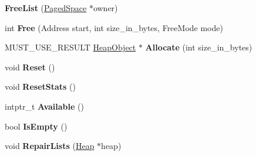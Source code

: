 \begin{DoxyCompactItemize}
\item 
{\bfseries Free\+List} (\hyperlink{classv8_1_1internal_1_1_paged_space}{Paged\+Space} $\ast$owner)\hypertarget{classv8_1_1internal_1_1_free_list_a60ffede5ec2f86afe99b4b10ee04dc2f}{}\label{classv8_1_1internal_1_1_free_list_a60ffede5ec2f86afe99b4b10ee04dc2f}

\item 
int {\bfseries Free} (Address start, int size\+\_\+in\+\_\+bytes, Free\+Mode mode)\hypertarget{classv8_1_1internal_1_1_free_list_a73700f8a2f6a9e94da40fa5bc18ea7dd}{}\label{classv8_1_1internal_1_1_free_list_a73700f8a2f6a9e94da40fa5bc18ea7dd}

\item 
M\+U\+S\+T\+\_\+\+U\+S\+E\+\_\+\+R\+E\+S\+U\+LT \hyperlink{classv8_1_1internal_1_1_heap_object}{Heap\+Object} $\ast$ {\bfseries Allocate} (int size\+\_\+in\+\_\+bytes)\hypertarget{classv8_1_1internal_1_1_free_list_a505524588fa29bd0b5f3a1b2b1ad1c40}{}\label{classv8_1_1internal_1_1_free_list_a505524588fa29bd0b5f3a1b2b1ad1c40}

\item 
void {\bfseries Reset} ()\hypertarget{classv8_1_1internal_1_1_free_list_ab4abea8fbd917cb43b9b440ef1010342}{}\label{classv8_1_1internal_1_1_free_list_ab4abea8fbd917cb43b9b440ef1010342}

\item 
void {\bfseries Reset\+Stats} ()\hypertarget{classv8_1_1internal_1_1_free_list_a83333dbec29d445106f9bcfbe4313816}{}\label{classv8_1_1internal_1_1_free_list_a83333dbec29d445106f9bcfbe4313816}

\item 
intptr\+\_\+t {\bfseries Available} ()\hypertarget{classv8_1_1internal_1_1_free_list_a526b3a4d01bfa8171b6a372594fce638}{}\label{classv8_1_1internal_1_1_free_list_a526b3a4d01bfa8171b6a372594fce638}

\item 
bool {\bfseries Is\+Empty} ()\hypertarget{classv8_1_1internal_1_1_free_list_a7c78f22b1971e2943be876918d163dd0}{}\label{classv8_1_1internal_1_1_free_list_a7c78f22b1971e2943be876918d163dd0}

\item 
void {\bfseries Repair\+Lists} (\hyperlink{classv8_1_1internal_1_1_heap}{Heap} $\ast$heap)\hypertarget{classv8_1_1internal_1_1_free_list_aeeb8bd0cb83326e7985985b468597d14}{}\label{classv8_1_1internal_1_1_free_list_aeeb8bd0cb83326e7985985b468597d14}


\end{DoxyCompactItemize}
